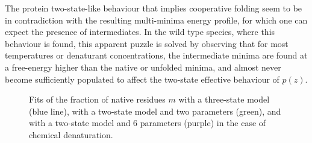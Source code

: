 The protein two-state-like behaviour that implies cooperative folding seem to be
in contradiction with the resulting multi-minima energy profile, for which one
can expect the presence of intermediates.
In the wild type species, where this behaviour is found, this apparent puzzle is
solved by observing that for most temperatures or denaturant concentrations, the
intermediate minima are found at a free-energy higher than the native or
unfolded minima, and almost
never become sufficiently populated to affect the two-state effective behaviour
of $p(z)$.

\begin{figure}
\centering
{}
\caption{Fits of the fraction of native residues $m$ with a three-state model
(blue line),  with a two-state model and two parameters (green), and with a
two-state model and 6 parameters (purple) in the case of chemical denaturation. 
}
\end{figure}
